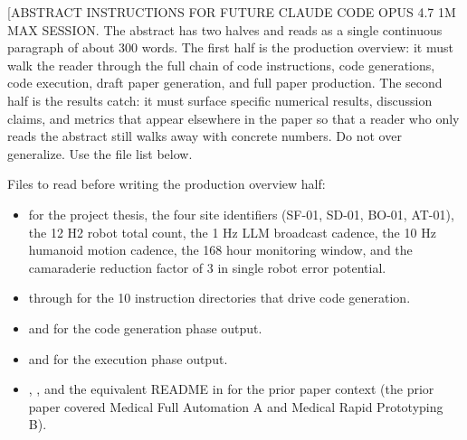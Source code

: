 %
%

\begin{sectionaccent}

[ABSTRACT INSTRUCTIONS FOR FUTURE CLAUDE CODE OPUS 4.7 1M MAX SESSION.
The abstract has two halves and reads as a single continuous paragraph
of about 300 words. The first half is the production overview: it must
walk the reader through the full chain of code instructions, code
generations, code execution, draft paper generation, and full paper
production. The second half is the results catch: it must surface
specific numerical results, discussion claims, and metrics that appear
elsewhere in the paper so that a reader who only reads the abstract
still walks away with concrete numbers. Do not over generalize. Use
the file list below.

Files to read before writing the production overview half:
\begin{itemize}
  \item {}
        for the project thesis, the four site identifiers (SF-01, SD-01,
        BO-01, AT-01), the 12 H2 robot total count, the 1 Hz LLM
        broadcast cadence, the 10 Hz humanoid motion cadence, the 168
        hour monitoring window, and the camaraderie reduction factor of
        3 in single robot error potential.
  \item {}
        through  for the 10 instruction
        directories that drive code generation.
  \item {} and
        for the code generation phase output.
  \item {}
        and 
        for the execution phase output.
  \item {},
        ,
        and the equivalent README in
        for the prior paper context (the prior paper covered Medical
        Full Automation A and Medical Rapid Prototyping B).
\end{itemize}


\end{sectionaccent}
